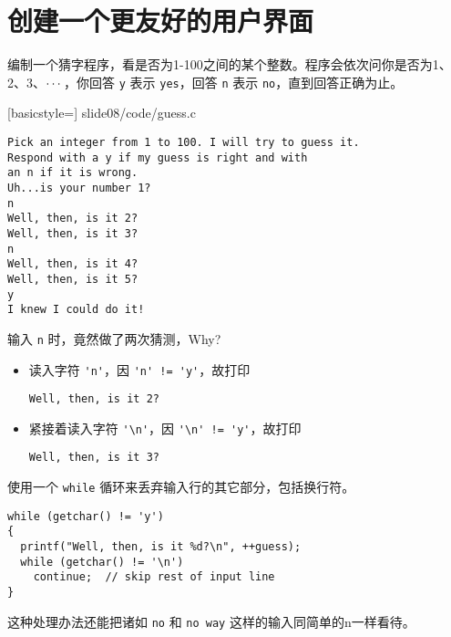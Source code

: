 \section{创建一个更友好的用户界面}
\begin{frame}[fragile]\ft{\secname}
  \begin{free}[例]{}
    编制一个猜字程序，看是否为1-100之间的某个整数。程序会依次问你是否为1、2、3、$\cdots$，你回答 \lstinline|y| 表示 \lstinline|yes|，回答 \lstinline|n| 表示 \lstinline|no|，直到回答正确为止。
  \end{free}
\end{frame}


\begin{frame}\ft{\secname}
  
  [basicstyle=\ttfamily\small]
  {slide08/code/guess.c}
\end{frame}

\begin{frame}[fragile]\ft{\secname}
\begin{lstlisting}[backgroundcolor=\color{blue!20}]
Pick an integer from 1 to 100. I will try to guess it.
Respond with a y if my guess is right and with
an n if it is wrong.
Uh...is your number 1?
n
Well, then, is it 2?
Well, then, is it 3?
n
Well, then, is it 4?
Well, then, is it 5?
y
I knew I could do it!
\end{lstlisting}
\end{frame}

\begin{frame}[fragile]\ft{\secname}
输入 \lstinline|n| 时，竟然做了两次猜测，Why? \pause \vspace{0.1in}

\pause \vspace{0.1in}

\begin{itemize}
\item 读入字符 \lstinline|'n'|，因 \lstinline|'n' != 'y'|，故打印
\begin{lstlisting}
Well, then, is it 2?
\end{lstlisting}
\item 紧接着读入字符 \lstinline|'\n'|，因 \lstinline|'\n' != 'y'|，故打印
\begin{lstlisting}
Well, then, is it 3?
\end{lstlisting}
\end{itemize}
\end{frame}

\begin{frame}[fragile]
使用一个 \lstinline|while| 循环来丢弃输入行的其它部分，包括换行符。
\begin{lstlisting}[]
while (getchar() != 'y')
{
  printf("Well, then, is it %d?\n", ++guess);
  while (getchar() != '\n')
    continue;  // skip rest of input line
}
\end{lstlisting}
这种处理办法还能把诸如 \lstinline|no| 和 \lstinline|no way| 这样的输入同简单的n一样看待。
\end{frame}

